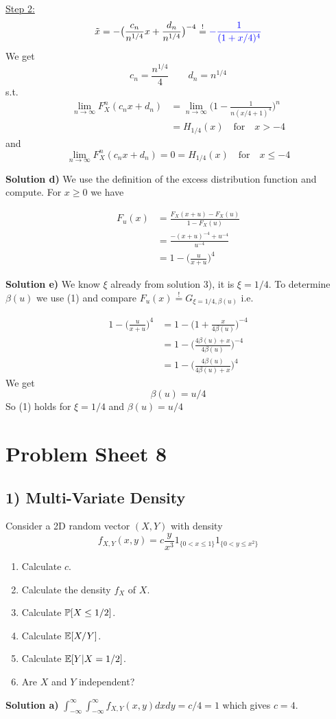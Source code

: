 \underline{Step 2:}
\[
    \tilde{x} = - \big(\frac{c_n}{n^{1/4}}x + \frac{d_n}{n^{1/4}}\big)^{-4}
    \overset{!}{=}  \textcolor{blue}{- \frac{1}{(1+x/4)^4}}
\]
We get
\[
    c_n = \frac{n^{1/4}}{4} \qquad d_n = n^{1/4}
\]
s.t.
\begin{align*}
    \lim_{n\to\infty}F^n_X(c_n x + d_n) &= \lim_{n\to\infty}\bigg(1 - \frac{1}{n(x/4 + 1)^4}\bigg)^n \\
    &= H_{1/4}(x) \quad \text{for} \quad x > -4
\end{align*}
and
\[
    \lim_{n\to\infty}F^n_X(c_n x + d_n) = 0 = H_{1/4}(x) \quad \text{for} \quad x \leq -4
\]

\textbf{Solution d)} We use the definition of the excess distribution function and compute. For $x \geq 0$ we have

\begin{align*}
    F_u(x) &= \frac{F_X(x+u) - F_X(u)}{1 - F_X(u)} \\
           &= \frac{-(x+u)^{-4} + u^{-4}}{u^{-4}} \\
           &= 1 - \bigg(\frac{u}{x+u}\bigg)^4
\end{align*}

\textbf{Solution e)}
We know $\xi$ already from solution 3), it is $\xi = 1/4$. To determine $\beta(u)$ we use (1) and compare $F_u(x) \overset{!}{=} G_{\xi = 1/4, \beta(u)}$ i.e.

\begin{align*}
    1 - \bigg(\frac{u}{x+u}\bigg)^4 &= 1 - \bigg(1 + \frac{x}{4\beta(u)}\bigg)^{-4} \\
    &= 1 - \bigg(\frac{4\beta(u) + x}{4\beta(u)}\bigg)^{-4} \\
    &= 1 - \bigg(\frac{4\beta(u)}{4\beta(u) + x}\bigg)^{4}
\end{align*}
We get
\[
    \beta(u) = u/4
\]
So (1) holds for $\xi = 1/4$ and $\beta(u) = u/4$

%
%
\section*{Problem Sheet 8}
%
%
\subsection*{1) Multi-Variate Density}
Consider a 2D random vector $(X,Y)$ with density
\[
    f_{X,Y}(x,y) = c\frac{y}{x^3}1_{\{0 < x \leq 1\}}1_{\{0 < y \leq x^2\}}
\]
\begin{enumerate}[label=(\alph*)]
    \item Calculate $c$.
    \item Calculate the density $f_X$ of $X$.
    \item Calculate $\mathbb{P}[X \leq 1/2]$.
    \item Calculate $\mathbb{E}[X/Y]$.
    \item Calculate $\mathbb{E}[Y | X = 1/2]$.
    \item Are $X$ and $Y$ independent?
\end{enumerate}
\textbf{Solution a)} $\int_{-\infty}^\infty \int_{-\infty}^\infty f_{X,Y}(x,y) dx dy = c/4 = 1$ which gives $c = 4$.


